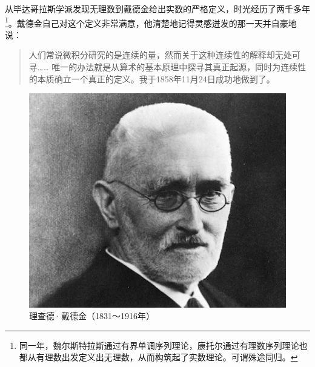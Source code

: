 \documentclass[b5paper]{ctexart}
\begin{document}
从毕达哥拉斯学派发现无理数到戴德金给出实数的严格定义，时光经历了两千多年\footnote{同一年，魏尔斯特拉斯通过有界单调序列理论，康托尔通过有理数序列理论也都从有理数出发定义出无理数，从而构筑起了实数理论。可谓殊途同归。}。戴德金自己对这个定义非常满意，他清楚地记得灵感迸发的那一天并自豪地说：

\begin{quotation}
人们常说微积分研究的是连续的量，然而关于这种连续性的解释却无处可寻…… 唯一的办法就是从算术的基本原理中探寻其真正起源，同时为连续性的本质确立一个真正的定义。我于1858年11月24日成功地做到了。
\end{quotation}

\begin{figure}[htbp]
 \centering
 \includegraphics[scale=0.4]{img/Dedekind}
 \caption{理查德·戴德金（1831～1916年）}
 \label{fig:Dedekind}
\end{figure}
\end{document}
